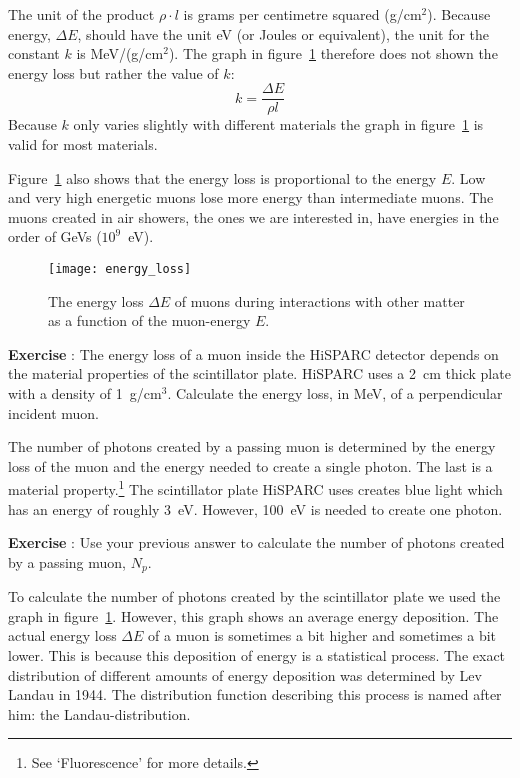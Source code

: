 The unit of the product $\rho \cdot l$ is grams per centimetre squared (g/cm$^2$). Because energy, $\Delta E$, should have the unit eV (or Joules or equivalent), the unit for the constant $k$ is MeV/(g/cm$^2$). The graph in figure~\ref{fig:energy_loss} therefore does not shown the energy loss but rather the value of $k$:
\begin{equation}
k = \frac{\Delta E}{\rho l }
\end{equation}
Because $k$ only varies slightly with different materials the graph in figure~\ref{fig:energy_loss} is valid for most materials.

Figure~\ref{fig:energy_loss} also shows that the energy loss is proportional to the energy $E$. Low and very high energetic muons lose more energy than intermediate muons. The muons created in air showers, the ones we are interested in, have energies in the order of GeVs ($10^9$~eV).

\begin{figure}\begin{center}
\texttt{[image: energy\_loss]}%
\caption{The energy loss $\Delta E$ of muons during interactions with other matter as a function of the muon-energy $E$.}\label{fig:energy_loss}
\end{center}\end{figure}

\begin{shaded}
\textbf{Exercise \theExercise {}} : The energy loss of a muon inside the HiSPARC detector depends on the material properties of the scintillator plate. HiSPARC uses a 2~cm thick plate with a density of 1~g/cm$^3$. Calculate the energy loss, in MeV, of a perpendicular incident muon.\end{shaded}

The number of photons created by a passing muon is determined by the energy loss of the muon and the energy needed to create a single photon. The last is a material property.\footnote{See `Fluorescence' for more details.} The scintillator plate HiSPARC uses creates blue light which has an energy of roughly 3~eV. However, 100~eV is needed to create one photon. 

\begin{shaded}
\textbf{Exercise \theExercise {}} :  Use your previous answer to calculate the number of photons created by a passing muon, $N_p$.\end{shaded}

To calculate the number of photons created by the scintillator plate we used the  graph in figure~\ref{fig:energy_loss}. However, this graph shows an average energy deposition. The actual energy loss $\Delta E$ of a muon is sometimes a bit higher and sometimes a bit lower. This is because this deposition of energy is a statistical process. The exact distribution of different amounts of energy deposition was determined by Lev Landau in 1944. The distribution function describing this process is named after him: the Landau-distribution.

